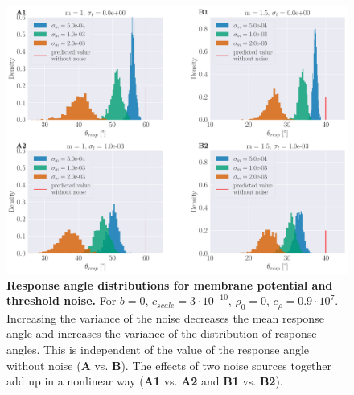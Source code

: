 \documentclass[a4paper,10pt,hidelinks]{scrreprt}
\begin{document}
    \begin{figure}[H]
    	\begin{center}
			\includegraphics[width=\textwidth]{figure_stationary_noisy_params.pdf}
    	\end{center}
    	\caption{\textbf{Response angle distributions for membrane potential and threshold noise.} For $b=0$, $c_{scale}=3\cdot10^{-10}$, $\rho_{0}=0$, $c_{\rho}=0.9\cdot 10^{7}$. Increasing the variance of the noise decreases the mean response angle and increases the variance of the distribution of response angles. This is independent of the value of the response angle without noise (\textbf{A} vs. \textbf{B}). The effects of two noise sources together add up in a nonlinear way (\textbf{A1} vs. \textbf{A2} and \textbf{B1} vs. \textbf{B2}).}
    	\label{fig:effect_noise_stationary}
    \end{figure}
    
\end{document}
